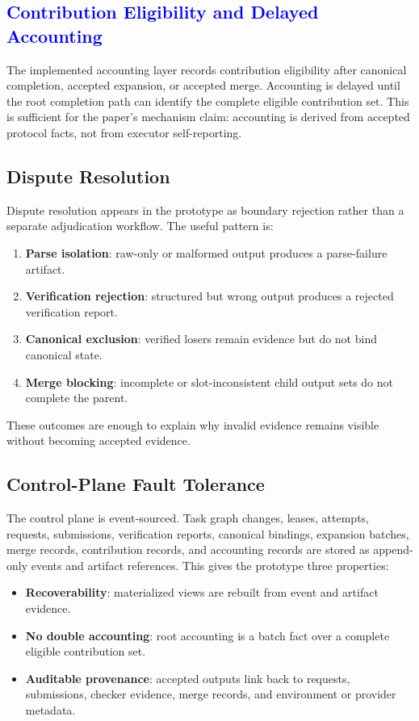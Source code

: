 \documentclass{article}
\theoremstyle{plain}
\begin{document}
\subsection{\textcolor{blue}{Contribution Eligibility and Delayed Accounting}}

{\color{blue}
The implemented accounting layer records contribution eligibility after canonical completion, accepted expansion, or accepted merge. Accounting is delayed until the root completion path can identify the complete eligible contribution set. This is sufficient for the paper's mechanism claim: accounting is derived from accepted protocol facts, not from executor self-reporting.
}

\subsection{Dispute Resolution}

{\color{blue}
Dispute resolution appears in the prototype as boundary rejection rather than a separate adjudication workflow. The useful pattern is:
\begin{enumerate}
\item \textbf{Parse isolation}: raw-only or malformed output produces a parse-failure artifact.
\item \textbf{Verification rejection}: structured but wrong output produces a rejected verification report.
\item \textbf{Canonical exclusion}: verified losers remain evidence but do not bind canonical state.
\item \textbf{Merge blocking}: incomplete or slot-inconsistent child output sets do not complete the parent.
\end{enumerate}
These outcomes are enough to explain why invalid evidence remains visible without becoming accepted evidence.
}

\subsection{Control-Plane Fault Tolerance}

{\color{blue}
The control plane is event-sourced. Task graph changes, leases, attempts, requests, submissions, verification reports, canonical bindings, expansion batches, merge records, contribution records, and accounting records are stored as append-only events and artifact references. This gives the prototype three properties:
\begin{itemize}
\item \textbf{Recoverability}: materialized views are rebuilt from event and artifact evidence.
\item \textbf{No double accounting}: root accounting is a batch fact over a complete eligible contribution set.
\item \textbf{Auditable provenance}: accepted outputs link back to requests, submissions, checker evidence, merge records, and environment or provider metadata.
\end{itemize}
}
\end{document}

